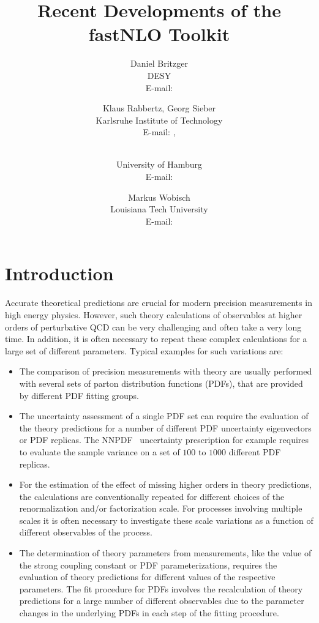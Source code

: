 \documentclass{PoS}
\title{Recent Developments of the fastNLO Toolkit}
\author{Daniel Britzger\\
        DESY\\
        E-mail: \email{daniel.britzger@desy.de}}
\author{Klaus Rabbertz, Georg Sieber\\
        Karlsruhe Institute of Technology\\
        E-mail: \email{klaus.rabbertz@cern.ch}, \email{georg.sieber@cern.ch}}
\author{\speaker{Fred Stober}\\
        University of Hamburg\\
        E-mail: \email{stober@cern.ch}}
\author{Markus Wobisch\\
        Louisiana Tech University\\
        E-mail: \email{wobisch@fnal.gov}}
\begin{document}
\section{Introduction}

Accurate theoretical predictions are crucial for modern
precision measurements in high energy physics.
However, such theory calculations of observables at higher orders
of perturbative QCD can be very challenging and often take a very long
time. In addition, it is often necessary to repeat these complex
calculations for a large set of different parameters. Typical examples for such variations are:

\begin{itemize}
\item The comparison of precision measurements with theory are usually
  performed with several sets of parton distribution functions (PDFs),
  that are provided by different PDF fitting groups. %
\item The uncertainty assessment of a single PDF set can require
  the evaluation of the theory predictions for a number of different
  PDF uncertainty eigenvectors or PDF replicas. The NNPDF~\cite{Ball:2014uwa} uncertainty
  prescription for example requires to evaluate the sample variance on a set of
  $100$ to $1000$ different PDF replicas.
\item For the estimation of the effect of missing higher orders in theory
  predictions, the calculations are conventionally repeated for different
  choices of the renormalization and/or factorization scale. For processes
  involving multiple scales it is often necessary to
  investigate these scale variations as a function of different observables of
  the process.
\item The determination of theory parameters from measurements, like
  the value of the strong coupling constant or PDF parameterizations,
  requires the evaluation of theory predictions for different values
  of the respective parameters.
  The fit procedure for PDFs involves the recalculation
  of theory predictions for a large number of different observables due to
  the parameter changes in the underlying PDFs in each step of the fitting procedure.
\end{itemize}
\end{document}
